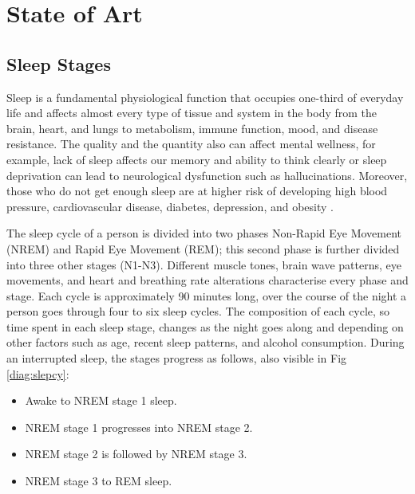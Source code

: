 \chapter{State of Art}
\section{Sleep Stages}

Sleep is a fundamental physiological function that occupies one-third of everyday life and affects almost every type of tissue and system in the body from the brain, heart, and lungs to metabolism, immune function, mood, and disease resistance. The quality and the quantity also can affect mental wellness, for example, lack of sleep affects our memory and ability to think clearly or sleep deprivation can lead to neurological dysfunction such as hallucinations. Moreover, those who do not get enough sleep are at higher risk of developing high blood pressure, cardiovascular disease, diabetes, depression, and obesity \cite{Colten2006SleepProblem}.

The sleep cycle of a person is divided into two phases Non-Rapid Eye Movement (NREM) and Rapid Eye Movement (REM); 
this second phase is further divided into three other stages (N1-N3). 
Different muscle tones, brain wave patterns, eye movements, and heart and breathing rate alterations characterise every phase and stage. Each cycle is approximately 90 minutes long, over the course of the night a person goes through four to six 
sleep cycles\cite{Patel2022PhysiologyStages}. The composition of each cycle, so time spent in each sleep stage, changes as the night goes along and depending on other factors such as age, recent sleep patterns, and alcohol consumption. 
During an interrupted sleep, the stages progress as follows, also visible in Fig \ref{diag:slepcy}:
\begin{itemize}
    \item Awake to NREM stage 1 sleep.
    \item NREM stage 1 progresses into NREM stage 2.
    \item NREM stage 2 is followed by NREM stage 3.
    \item NREM stage 3 to REM sleep.  
\end{itemize}

